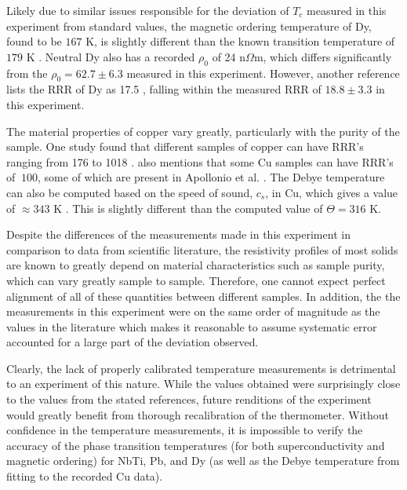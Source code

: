 \documentclass[prl,twocolumn,superscriptaddress,floatfix]{revtex4}
\begin{document}
Likely due to similar issues responsible for the deviation of $T_c$ measured in this experiment from standard values, the magnetic ordering temperature of Dy, found to be $167$ K, is slightly different than the known transition temperature of $179$ K \cite{Wilkinson1961-mk}.
Neutral Dy also has a recorded $\rho_{0}$ of 24 n$\Omega$m, which differs significantly from the $\rho_0=62.7\pm 6.3$ measured in this experiment. However, another reference lists the RRR of Dy as 17.5 \cite{Sokolenko2024-ls}, falling within the measured RRR of $18.8 \pm 3.3$ in this experiment.

The material properties of copper vary greatly, particularly with the purity of the sample. One study found that different samples of copper can have RRR's ranging from 176 to 1018 \cite{Vorobieva2001-vh}.
\citeauthor*{calatroni2020materialspropertiesthermal} \cite{calatroni2020materialspropertiesthermal} also mentions that some Cu samples can have RRR's of $~100$, some of which are present in Apollonio et al. \cite{cernRRR}. The Debye temperature can also be computed based on the speed of sound, $c_s$, in Cu, which gives a value of $\approx 343$ K \cite{Kittle}. This is slightly different than the computed value of $\Theta=316$ K.

Despite the differences of the measurements made in this experiment in comparison to data from scientific literature, the resistivity profiles of most solids are known to greatly depend on material characteristics such as sample purity, which can vary greatly sample to sample. Therefore, one cannot expect perfect alignment of all of these quantities between different samples. In addition, the the measurements in this experiment were on the same order of magnitude as the values in the literature which makes it reasonable to assume systematic error accounted for a large part of the deviation observed. 

Clearly, the lack of properly calibrated temperature measurements is detrimental to an experiment of this nature. While the values obtained were surprisingly close to the values from the stated references, future renditions of the experiment would greatly benefit from thorough recalibration of the thermometer. Without confidence in the temperature measurements, it is impossible to verify the accuracy of the phase transition temperatures (for both superconductivity and magnetic ordering) for NbTi, Pb, and Dy (as well as the Debye temperature from fitting to the recorded Cu data).
\end{document}

